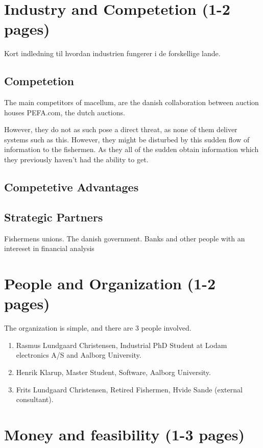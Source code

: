 \documentclass[a4paper,10pt,oneside,fleqn]{article}
\begin{document}
\section{Industry and Competetion (1-2 pages)}
Kort indledning til hvordan industrien fungerer i de forskellige lande. 

\subsection{Competetion}
The main competitors of macellum, are the danish collaboration between auction houses PEFA.com, the dutch auctions. 

However, they do not as such pose a direct threat, as none of them deliver systems such as this. However, they might be disturbed by this sudden flow of information to the fishermen. As they all of the sudden obtain information which they previously haven't had the ability to get. 



\subsection{Competetive Advantages}


\subsection{Strategic Partners}
Fishermens unions. 
The danish government.
Banks and other people with an intereset in financial analysis 

\section{People and Organization (1-2 pages)}
The organization is simple, and there are 3 people involved.
\begin{enumerate}
	\item Rasmus Lundgaard Christensen, Industrial PhD Student at Lodam electronics A/S and Aalborg University.
	\item Henrik Klarup, Master Student, Software, Aalborg University.
	\item Frits Lundgaard Christensen, Retired Fishermen, Hvide Sande (external consultant).
\end{enumerate}
 

\section{Money and feasibility (1-3 pages)}
\end{document}
